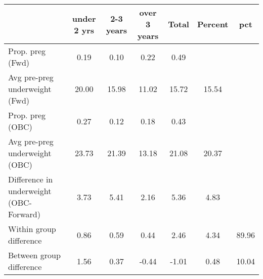 \begin{tabular}{l*{6}{c}}
\toprule
            &\multicolumn{1}{c}{under 2 yrs}&\multicolumn{1}{c}{2-3 years}&\multicolumn{1}{c}{over 3 years}&\multicolumn{1}{c}{Total}&\multicolumn{1}{c}{Percent}&\multicolumn{1}{c}{pct}\\
\midrule
\midrule
Prop. preg (Fwd)&        0.19&        0.10&        0.22&        0.49&            &            \\
Avg pre-preg underweight (Fwd)&       20.00&       15.98&       11.02&       15.72&       15.54&            \\
Prop. preg (OBC)&        0.27&        0.12&        0.18&        0.43&            &            \\
Avg pre-preg underweight (OBC)&       23.73&       21.39&       13.18&       21.08&       20.37&            \\
Difference in underweight (OBC-Forward)&        3.73&        5.41&        2.16&        5.36&        4.83&            \\
Within group difference&        0.86&        0.59&        0.44&        2.46&        4.34&       89.96\\
Between group difference&        1.56&        0.37&       -0.44&       -1.01&        0.48&       10.04\\
\bottomrule
\end{tabular}
